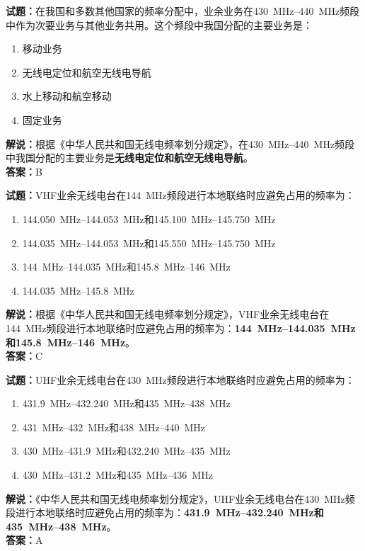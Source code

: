 \documentclass{ctexbook}
\begin{document}
\bigskip

\noindent\textbf{试题：}在我国和多数其他国家的频率分配中，业余业务在\qtyrange[range-phrase=--]{430}{440}{\MHz}频段中作为次要业务与其他业务共用。这个频段中我国分配的主要业务是：
\begin{enumerate}[leftmargin=3em]
  \item 移动业务
  \item 无线电定位和航空无线电导航
  \item 水上移动和航空移动
  \item 固定业务
\end{enumerate}
\noindent\textbf{解说：}根据《中华人民共和国无线电频率划分规定》，在\qtyrange[range-phrase=--]{430}{440}{\MHz}频段中我国分配的主要业务是\textbf{无线电定位和航空无线电导航}。\\\noindent\textbf{答案：}B

\bigskip

\noindent\textbf{试题：}VHF业余无线电台在\qty{144}{\MHz}频段进行本地联络时应避免占用的频率为：
\begin{enumerate}[leftmargin=3em]
  \item \qtyrange[range-phrase=--]{144.050}{144.053}{\MHz}和\qtyrange[range-phrase=--]{145.100}{145.750}{\MHz}
  \item \qtyrange[range-phrase=--]{144.035}{144.053}{\MHz}和\qtyrange[range-phrase=--]{145.550}{145.750}{\MHz}
  \item \qtyrange[range-phrase=--]{144}{144.035}{\MHz}和\qtyrange[range-phrase=--]{145.8}{146}{\MHz}
  \item \qtyrange[range-phrase=--]{144.035}{145.8}{\MHz}
\end{enumerate}
\noindent\textbf{解说：}根据《中华人民共和国无线电频率划分规定》，VHF业余无线电台在\qty{144}{\MHz}频段进行本地联络时应避免占用的频率为：\textbf{\qtyrange[range-phrase=--]{144}{144.035}{\MHz}和\qtyrange[range-phrase=--]{145.8}{146}{\MHz}}。\\\noindent\textbf{答案：}C

\bigskip

\noindent\textbf{试题：}UHF业余无线电台在\qty{430}{\MHz}频段进行本地联络时应避免占用的频率为：
\begin{enumerate}[leftmargin=3em]
  \item \qtyrange[range-phrase=--]{431.9}{432.240}{\MHz}和\qtyrange[range-phrase=--]{435}{438}{\MHz}
  \item \qtyrange[range-phrase=--]{431}{432}{\MHz}和\qtyrange[range-phrase=--]{438}{440}{\MHz}
  \item \qtyrange[range-phrase=--]{430}{431.9}{\MHz}和\qtyrange[range-phrase=--]{432.240}{435}{\MHz}
  \item \qtyrange[range-phrase=--]{430}{431.2}{\MHz}和\qtyrange[range-phrase=--]{435}{436}{\MHz}
\end{enumerate}
\noindent\textbf{解说：}《中华人民共和国无线电频率划分规定》，UHF业余无线电台在\qty{430}{\MHz}频段进行本地联络时应避免占用的频率为：\textbf{\qtyrange[range-phrase=--]{431.9}{432.240}{\MHz}和\qtyrange[range-phrase=--]{435}{438}{\MHz}}。\\\noindent\textbf{答案：}A
\end{document}
